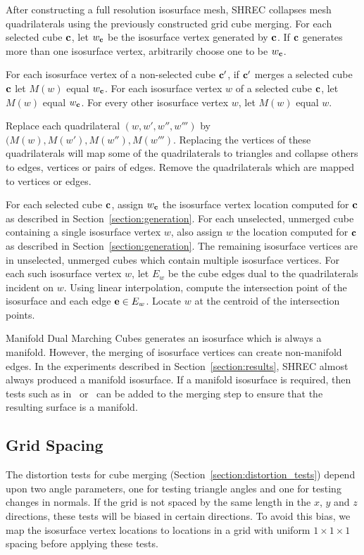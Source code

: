 After constructing a full resolution isosurface mesh,
SHREC collapses mesh quadrilaterals
using the previously constructed grid cube merging.
For each selected cube $\mathbf{c}$,
let $w_{\mathbf{c}}$ be the isosurface vertex generated by $\mathbf{c}$.
If $\mathbf{c}$ generates more than one isosurface vertex,
arbitrarily choose one to be $w_{\mathbf{c}}$.

For each isosurface vertex of a non-selected cube $\mathbf{c}'$,
if $\mathbf{c}'$ merges a selected cube $\mathbf{c}$
let $M(w)$ equal $w_{\mathbf{c}}$.
For each isosurface vertex $w$ of a selected cube $\mathbf{c}$, 
let $M(w)$ equal $w_{\mathbf{c}}$.
For every other isosurface vertex $w$, let $M(w)$ equal $w$.

Replace each quadrilateral $(w,w',w'',w''')$
by $(M(w), M(w'), M(w''), M(w''')$.
Replacing the vertices of these quadrilaterals
will map some of the quadrilaterals to triangles
and collapse others to edges, vertices or pairs of edges.
Remove the quadrilaterals which are mapped 
to vertices or edges.

For each selected cube $\mathbf{c}$,
assign $w_{\mathbf{c}}$ the isosurface vertex location computed for $\mathbf{c}$
as described in Section~\ref{section:generation}.
For each unselected, unmerged cube containing a single isosurface vertex $w$,
also assign $w$ the location computed for $\mathbf{c}$
as described in Section~\ref{section:generation}.
The remaining isosurface vertices are in unselected, unmerged cubes
which contain multiple isosurface vertices.
For each such isosurface vertex $w$,
let $E_w$ be the cube edges dual to the quadrilaterals incident on $w$.
Using linear interpolation,
compute the intersection point of the isosurface and each edge $\mathbf{e} \in E_w$.
Locate $w$ at the centroid of the intersection points.

Manifold Dual Marching Cubes generates an isosurface 
which is always a manifold.
However, the merging of isosurface vertices can create non-manifold edges.
In the experiments described in Section~\ref{section:results},
SHREC almost always produced a manifold isosurface.
If a manifold isosurface is required,
then tests such as in~\cite{degn-tpec-98} or~\cite{sjw-mdc-07}
can be added to the merging step
to ensure that the resulting surface is a manifold.


\subsection{Grid Spacing}
\label{section:spacing}

The distortion tests for cube merging (Section~\ref{section:distortion_tests})
depend upon two angle parameters,
one for testing triangle angles and one for testing changes in normals.
If the grid is not spaced by the same length 
in the $x$, $y$ and $z$ directions,
these tests will be biased in certain directions.
To avoid this bias,
we map the isosurface vertex locations
to locations in a grid with uniform $1 \times 1 \times 1$ spacing
before applying these tests.

